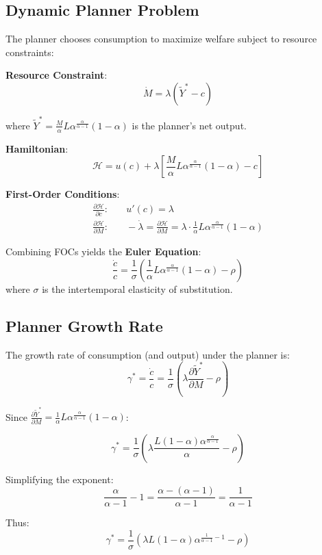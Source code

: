 \subsection{Dynamic Planner Problem}

The planner chooses consumption to maximize welfare subject to resource constraints:

\begin{derivationbox}
\textbf{Resource Constraint}:
\[
\dot{M} = \lambda (\tilde{Y}^* - c)
\]

where $\tilde{Y}^* = \frac{M}{\alpha} L \alpha^{\frac{\alpha}{\alpha-1}} (1-\alpha)$ is
the planner's net output.

\medskip
\textbf{Hamiltonian}:
\[
\mathcal{H} = u(c) + \lambda \left[ \frac{M}{\alpha} L \alpha^{\frac{\alpha}{\alpha-1}} (1-\alpha) - c \right]
\]

\medskip
\textbf{First-Order Conditions}:
\begin{align*}
\frac{\partial \mathcal{H}}{\partial c}: & \quad u'(c) = \lambda \tag{FOC-c} \\
\frac{\partial \mathcal{H}}{\partial M}: & \quad -\dot{\lambda} = \frac{\partial \mathcal{H}}{\partial M}
   = \lambda \cdot \frac{1}{\alpha} L \alpha^{\frac{\alpha}{\alpha-1}} (1-\alpha) \tag{FOC-M}
\end{align*}
\end{derivationbox}

\begin{resultbox}
Combining FOCs yields the \textbf{Euler Equation}:
\[
\frac{\dot{c}}{c} = \frac{1}{\sigma} \left( \frac{1}{\alpha} L \alpha^{\frac{\alpha}{\alpha-1}} (1-\alpha) - \rho \right)
\tag{Planner Euler}
\]
where $\sigma$ is the intertemporal elasticity of substitution.
\end{resultbox}

\subsection{Planner Growth Rate}

\begin{derivationbox}
The growth rate of consumption (and output) under the planner is:
\[
\gamma^* = \frac{\dot{c}}{c} = \frac{1}{\sigma} \left( \lambda \frac{\partial \tilde{Y}^*}{\partial M} - \rho \right)
\]

Since $\frac{\partial \tilde{Y}^*}{\partial M} = \frac{1}{\alpha} L \alpha^{\frac{\alpha}{\alpha-1}} (1-\alpha)$:

\[
\gamma^* = \frac{1}{\sigma} \left( \lambda \frac{L (1-\alpha) \alpha^{\frac{\alpha}{\alpha-1}}}{\alpha} - \rho \right)
\]

Simplifying the exponent:
\[
\frac{\alpha}{\alpha-1} - 1 = \frac{\alpha - (\alpha-1)}{\alpha-1} = \frac{1}{\alpha-1}
\]

Thus:
\[
\gamma^* = \frac{1}{\sigma} \left( \lambda L (1-\alpha) \alpha^{\frac{1}{\alpha-1}-1} - \rho \right)
\]
\end{derivationbox}

